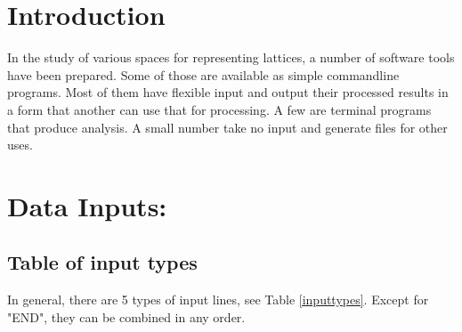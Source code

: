 \documentclass[preprint]{iucr}              %
\numberwithin{equation}{section}
\begin{document}
	\newcommand{\ci}[0]{$c_1$}
	\newcommand{\cii}[0]{$c_2$}
	\newcommand{\ciii}[0]{$c_3$}
	
	
	\section{Introduction}
	
	
	In the study of various spaces for representing lattices, a
	number of software tools have been prepared. Some of those
	are available as simple commandline programs. Most of them
	have flexible input and output their processed results in 
	a form that another can use that for processing. A few
	are terminal programs that produce analysis. A small
	number take no input and generate files for other uses.
	
	
	
	
	\section{Data Inputs:}
	\subsection{Table of input types}
	
	In general, there are 5 types of input lines, see Table \ref{inputtypes}.
	Except for "END", they can be combined in any order.
	
\end{document}
